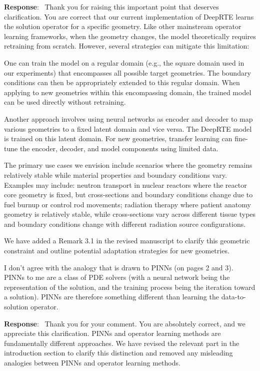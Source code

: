 \documentclass[12pt]{article}
\newcounter{reviewer}
\newcounter{point}[reviewer]
\renewcommand{\thepoint}{P\,\thereviewer.\arabic{point}}
\newenvironment{point}{\refstepcounter{point} \bigskip \noindent {\textbf{[Reviewer~Point~\thepoint]} }  }{\par }
\newenvironment{reply}{\medskip \noindent \textbf{Response}:\  \color{blue}\ignorespaces}{\medskip}
\begin{document}
\begin{reply}
	Thank you for raising this important point that deserves clarification. You are correct that our current implementation of DeepRTE learns the solution operator for a specific geometry. Like other mainstream operator learning frameworks, when the geometry changes, the model theoretically requires retraining from scratch. However, several strategies can mitigate this limitation:

	One can train the model on a regular domain (e.g., the square domain used in our experiments) that encompasses all possible target geometries. The boundary conditions can then be appropriately extended to this regular domain. When applying to new geometries within this encompassing domain, the trained model can be used directly without retraining.

	Another approach involves using neural networks as encoder and decoder to map various geometries to a fixed latent domain and vice versa. The DeepRTE model is trained on this latent domain. For new geometries, transfer learning can fine-tune the encoder, decoder, and model components using limited data.

	The primary use cases we envision include scenarios where the geometry remains relatively stable while material properties and boundary conditions vary. Examples may include:
	neutron transport in nuclear reactors where the reactor core geometry is fixed, but cross-sections and boundary conditions change due to fuel burnup or control rod movements;
	radiation therapy where patient anatomy geometry is relatively stable, while cross-sections vary across different tissue types and boundary conditions change with different radiation source configurations.

	We have added a Remark 3.1 in the revised manuscript to clarify this geometric constraint and outline potential adaptation strategies for new geometries.
\end{reply}

\begin{point}
	I don't agree with the analogy that is drawn to PINNs (on pages 2 and 3). PINNs to me are a class of PDE solvers (with a neural network being the representation of the solution, and the training process being the iteration toward a solution). PINNs are therefore something different than learning the data-to-solution operator.
\end{point}

\begin{reply}
	Thank you for your comment.
	You are absolutely correct, and we appreciate this clarification. PINNs and operator learning methods are fundamentally different approaches.
	We have revised the relevant part in the introduction section to clarify this distinction and removed any misleading analogies between PINNs and operator learning methods.
\end{reply}
\end{document}
